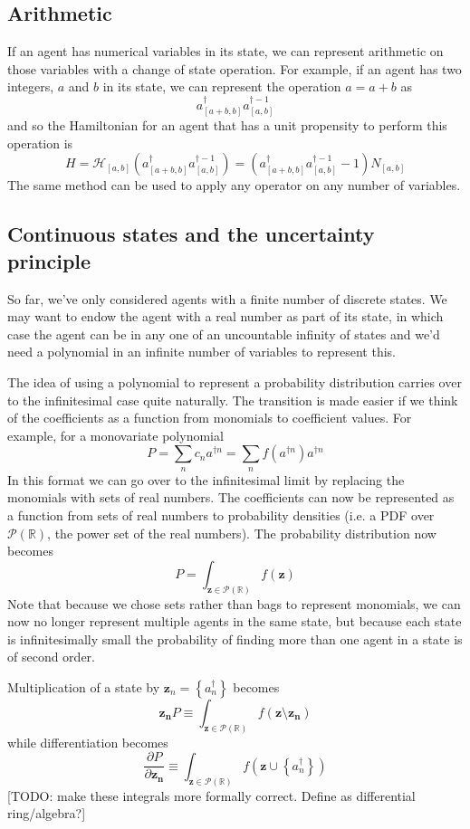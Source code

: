 \documentclass[letterpaper,twocolumn,10pt]{article}
\begin{document}
\subsection{Arithmetic}

If an agent has numerical variables in its state, we can represent arithmetic on those variables with a change of state operation. For example, if an agent has two integers, $a$ and $b$ in its state, we can represent the operation $a = a + b$ as
\[
a^\dag_{[a+b,b]}a^{\dag-1}_{[a,b]}
\]
and so the Hamiltonian for an agent that has a unit propensity to perform this operation is
\[
H = \mathcal{H}_{[a,b]}(a^\dag_{[a+b,b]}a^{\dag-1}_{[a,b]}) = (a^\dag_{[a+b,b]}a^{\dag-1}_{[a,b]}-1)N_{[a,b]}
\]
The same method can be used to apply any operator on any number of variables.

\subsection{Continuous states and the uncertainty principle}

So far, we've only considered agents with a finite number of discrete states. We may want to endow the agent with a real number as part of its state, in which case the agent can be in any one of an uncountable infinity of states and we'd need a polynomial in an infinite number of variables to represent this.

The idea of using a polynomial to represent a probability distribution carries over to the infinitesimal case quite naturally. The transition is made easier if we think of the coefficients as a function from monomials to coefficient values. For example, for a monovariate polynomial
\[
P = \sum_n c_n a^{\dag n} = \sum_n f(a^{\dag n})a^{\dag n} 
\]
In this format we can go over to the infinitesimal limit by replacing the monomials with sets of real numbers. The coefficients can now be represented as a function from sets of real numbers to probability densities (i.e. a PDF over $\mathcal{P}(\mathbb{R})$, the power set of the real numbers). The probability distribution now becomes
\[
P = \int_{\mathbf{z} \in \mathcal{P}(\mathbb{R})} f(\mathbf{z})
\]
Note that because we chose sets rather than bags to represent monomials, we can now no longer represent multiple agents in the same state, but because each state is infinitesimally small the probability of finding more than one agent in a state is of second order.

Multiplication of a state by $\mathbf{z}_n = \left\{a^\dag_n\right\}$ becomes
\[
\mathbf{z_n}P \equiv \int_{\mathbf{z} \in \mathcal{P}(\mathbb{R})} f(\mathbf{z} \setminus\mathbf{z_n})
\]
while differentiation becomes
\[
\frac{\partial P}{\partial \mathbf{z_n}}  \equiv \int_{\mathbf{z} \in \mathcal{P}(\mathbb{R})} f(\mathbf{z} \cup \left\{a^\dag_n\right\})
\]
[TODO: make these integrals more formally correct. Define as differential ring/algebra?]
\end{document}

